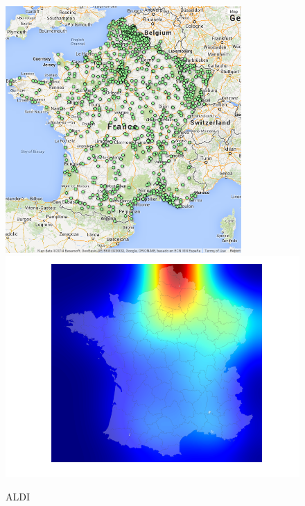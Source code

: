 \documentclass[11pt]{article}
\begin{document}
\begin{figure}[H]
    \caption{ALDI}
	\centering
		\includegraphics[width=9cm]{images/maps_group_dots/ALDI.png}
        \includegraphics[width=12.8cm]{images/maps_group_heatmaps/ALDI.png}
\end{figure}
\end{document}
